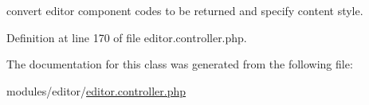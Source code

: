 convert editor component codes to be returned and specify content style. 



Definition at line 170 of file editor.\+controller.\+php.



The documentation for this class was generated from the following file\+:\begin{DoxyCompactItemize}
\item 
modules/editor/\hyperlink{editor_8controller_8php}{editor.\+controller.\+php}\end{DoxyCompactItemize}
